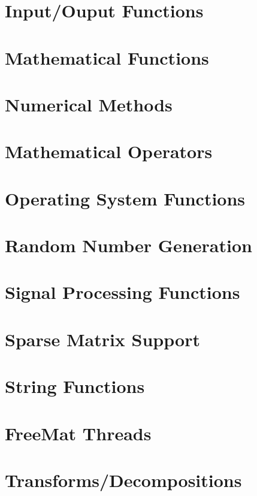 \documentclass{book}
\begin{document}
\chapter{Input/\-Ouput Functions}
\label{sec_io}
\hypertarget{sec_io}{}

\chapter{Mathematical Functions}
\label{sec_mathfunctions}
\hypertarget{sec_mathfunctions}{}

\chapter{Numerical Methods}
\label{sec_num}
\hypertarget{sec_num}{}

\chapter{Mathematical Operators}
\label{sec_operators}
\hypertarget{sec_operators}{}

\chapter{Operating System Functions}
\label{sec_os}
\hypertarget{sec_os}{}

\chapter{Random Number Generation}
\label{sec_random}
\hypertarget{sec_random}{}

\chapter{Signal Processing Functions}
\label{sec_signal}
\hypertarget{sec_signal}{}

\chapter{Sparse Matrix Support}
\label{sec_sparse}
\hypertarget{sec_sparse}{}

\chapter{String Functions}
\label{sec_string}
\hypertarget{sec_string}{}

\chapter{Free\-Mat Threads}
\label{sec_thread}
\hypertarget{sec_thread}{}

\chapter{Transforms/\-Decompositions}
\label{sec_transforms}
\hypertarget{sec_transforms}{}

\end{document}
